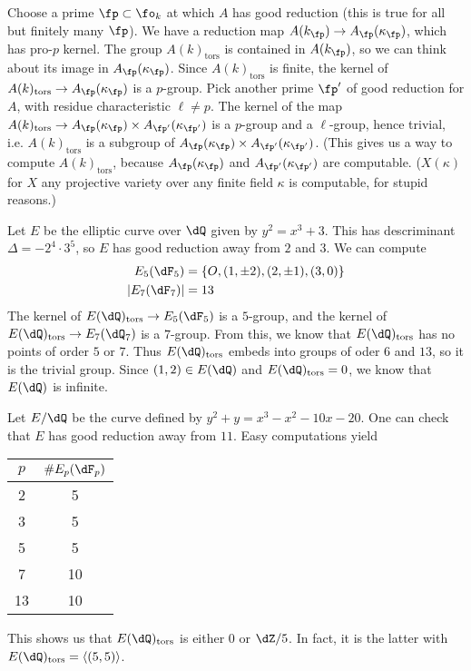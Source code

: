 Choose a prime $\fp\subset \fo_k$ at which $A$ has good reduction (this is true 
for all but finitely many $\fp$). We have a reduction map 
$A(k_\fp)\to A_\fp(\kappa_\fp)$, which has pro-$p$ kernel. The group 
$A(k)_\text{tors}$ is contained in $A(k_\fp)$, so we can think about its image 
in $A_\fp(\kappa_\fp)$. Since $A(k)_\text{tors}$ is finite, the kernel of 
$A(k)_\text{tors}\to A_\fp(\kappa_\fp)$ is a $p$-group. Pick another prime 
$\fp'$ of good reduction for $A$, with residue characteristic $\ell\ne p$. The 
kernel of the map 
$A(k)_\text{tors}\to A_\fp(\kappa_\fp)\times A_{\fp'}(\kappa_{\fp'})$ is a 
$p$-group and a $\ell$-group, hence trivial, i.e. $A(k)_\text{tors}$ is a 
subgroup of $A_\fp(\kappa_\fp)\times A_{\fp'}(\kappa_{\fp'})$. (This gives us a 
way to compute $A(k)_\text{tors}$, because $A_\fp(\kappa_\fp)$ and 
$A_{\fp'}(\kappa_{\fp'})$ are computable. ($X(\kappa)$ for $X$ any projective 
variety over any finite field $\kappa$ is computable, for stupid reasons.)

\begin{example}
Let $E$ be the elliptic curve over $\dQ$ given by $y^2=x^3+3$. This has 
descriminant $\Delta=-2^4\cdot 3^5$, so $E$ has good reduction away from $2$ 
and $3$. We can compute 
\begin{align*}
  E_5(\dF_5) &= \{O,(1,\pm 2),(2,\pm 1),(3,0)\} \\
  \left|E_7(\dF_7)\right| &= 13
\end{align*}
The kernel of $E(\dQ)_\text{tors}\to E_5(\dF_5)$ is a $5$-group, and the kernel 
of $E(\dQ)_\text{tors}\to E_7(\dQ_7)$ is a $7$-group. From this, we know that 
$E(\dQ)_\text{tors}$ has no points of order $5$ or $7$. Thus  
$E(\dQ)_\text{tors}$ embeds into groups of oder $6$ and $13$, so it is the 
trivial group. Since $(1,2)\in E(\dQ)$ and $E(\dQ)_\text{tors}=0$, we know that 
$E(\dQ)$ is infinite. 
\end{example}

\begin{example}
Let $E/\dQ$ be the curve defined by $y^2 + y = x^3-x^2-10 x-20$. One can check 
that $E$ has good reduction away from $11$. Easy computations yield 
\begin{center}
  \begin{tabular}{c|c}
    $p$ & $  \# E_p(\dF_p)$ \\ \hline
    2   & 5  \\
    3   & 5  \\
    5   & 5  \\
    7   & 10 \\
    13  & 10
  \end{tabular}
\end{center}
This shows us that $E(\dQ)_\text{tors}$ is either $0$ or $\dZ/5$. In fact, it 
is the latter with $E(\dQ)_\text{tors}=\langle (5,5)\rangle$. 
\end{example}

